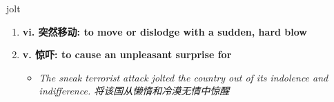 
\begin{frame}
{\huge jolt}
\begin{center}
\begin{enumerate}\Large
  \item \textbf{vi. 突然移动: to move or dislodge with a sudden, hard blow}
  \item \textbf{v. 惊吓: to cause an unpleasant surprise for}
  \begin{itemize}
    \item \em{\Large{The sneak terrorist attack jolted the country out of its indolence and indifference. 将该国从懒惰和冷漠无情中惊醒}}
  \end{itemize}
\end{enumerate}
\end{center}
\end{frame}

